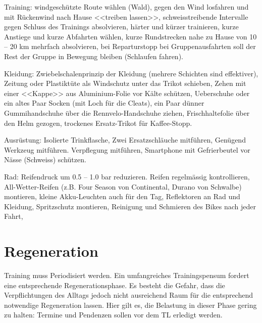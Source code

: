 \documentclass[a4paper,DIV13,BCOR0cm]{scrartcl}
\newcommand{\rv}{Rennvelo}
\begin{document}
\begin{itemize*}
        \item Training:
                windgeschützte Route wählen (Wald),
                gegen den Wind losfahren und mit Rückenwind nach Hause <<treiben lassen>>,
                schweisstreibende Intervalle gegen Schluss des Trainings absolvieren,
                härter und kürzer trainieren,
                kurze Anstiege und kurze Abfahrten wählen,
                kurze Rundstrecken nahe zu Hause von 10 -- 20 km mehrfach absolvieren,
                bei Reparturstopp bei Gruppenausfahrten soll der Rest der Gruppe in Bewegung bleiben (Schlaufen fahren).
        \item Kleidung:
                Zwiebelschalenprinzip der Kleidung (mehrere Schichten sind effektiver),
                Zeitung oder Plastiktüte als Windschutz unter das Trikot schieben,
                Zehen mit einer <<Kappe>> aus Aluminium-Folie vor Kälte schützen,
                Ueberschuhe oder ein altes Paar Socken (mit Loch für die Cleats),
                ein Paar dünner Gummihandschuhe über die \rv-Handschuhe ziehen,
                Frischhaltefolie über den Helm gezogen,
                trockenes Ersatz-Trikot für Kaffee-Stopp.
        \item Ausrüstung:
                Isolierte Trinkflasche,
                Zwei Ersatzschläuche mitführen,
                Genügend Werkzeug mitführen.
                Verpflegung mitführen,
                Smartphone mit Gefrierbeutel vor Nässe (Schweiss) schützen.
        \item Rad:
                Reifendruck um 0.5 -- 1.0 bar reduzieren.
                Reifen regelmässig kontrollieren,
                All-Wetter-Reifen (z.B. Four Season von Continental, Durano von Schwalbe) montieren,
                kleine Akku-Leuchten auch für den Tag,
                Reflektoren an Rad und Kleidung,
                Spritzschutz montieren,
                Reinigung und Schmieren des Bikes nach jeder Fahrt,

\end{itemize*}

\section{Regeneration}

Training muss Periodisiert werden. Ein umfangreiches Trainingspensum fordert eine entsprechende Regenerationsphase.
Es besteht die Gefahr, dass die Verpflichtungen des Alltags jedoch nicht ausreichend Raum für die entsprechend notwendige Regeneration lassen.
Hier gilt es, die Belastung in dieser Phase gering zu halten: Termine und Pendenzen sollen vor dem TL erledigt werden.
\end{document}
